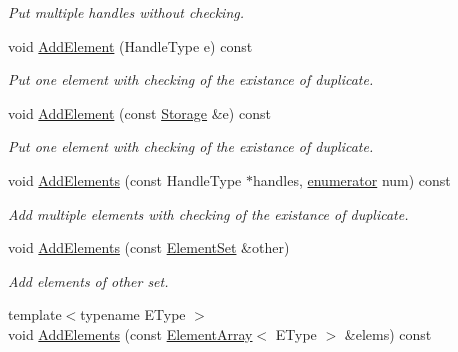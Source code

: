 \begin{DoxyCompactItemize}
\begin{DoxyCompactList}\small\item\em Put multiple handles without checking. \end{DoxyCompactList}\item 
void \hyperlink{classINMOST_1_1ElementSet_ad055a42db8847e0cb2465069640dd19f}{Add\-Element} (Handle\-Type e) const 
\begin{DoxyCompactList}\small\item\em Put one element with checking of the existance of duplicate. \end{DoxyCompactList}\item 
void \hyperlink{classINMOST_1_1ElementSet_a346401d86638322c22cbe6aa2b4ce5e0}{Add\-Element} (const \hyperlink{classINMOST_1_1Storage}{Storage} \&e) const 
\begin{DoxyCompactList}\small\item\em Put one element with checking of the existance of duplicate. \end{DoxyCompactList}\item 
void \hyperlink{classINMOST_1_1ElementSet_af2e19ddbc09fe43f7379ab9a30949c17}{Add\-Elements} (const Handle\-Type $\ast$handles, \hyperlink{classINMOST_1_1Storage_ae333dfced6fa9cfde0c8e7dcf1b0cc2b}{enumerator} num) const 
\begin{DoxyCompactList}\small\item\em Add multiple elements with checking of the existance of duplicate. \end{DoxyCompactList}\item 
\hypertarget{classINMOST_1_1ElementSet_addc80aa711d89d55b57885d788fba296}{void \hyperlink{classINMOST_1_1ElementSet_addc80aa711d89d55b57885d788fba296}{Add\-Elements} (const \hyperlink{classINMOST_1_1ElementSet}{Element\-Set} \&other)}\label{classINMOST_1_1ElementSet_addc80aa711d89d55b57885d788fba296}

\begin{DoxyCompactList}\small\item\em Add elements of other set. \end{DoxyCompactList}\item 
\hypertarget{classINMOST_1_1ElementSet_aba2a21178003aa2a9908ca3c090d7cb8}{{\footnotesize template$<$typename E\-Type $>$ }\\void \hyperlink{classINMOST_1_1ElementSet_aba2a21178003aa2a9908ca3c090d7cb8}{Add\-Elements} (const \hyperlink{classINMOST_1_1ElementArray}{Element\-Array}$<$ E\-Type $>$ \&elems) const }\label{classINMOST_1_1ElementSet_aba2a21178003aa2a9908ca3c090d7cb8}


\end{DoxyCompactItemize}
